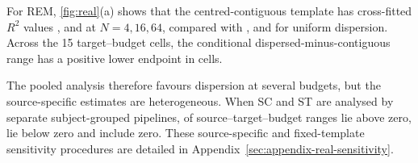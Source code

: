 For REM, \cref{fig:real}(a) shows that the centred-contiguous template has
cross-fitted $R^2$ values \numCfContigFour, \numCfContigSixteen{} and
\numCfContigSixtyFour{} at $N=4,16,64$, compared with
\numCfUniformFour, \numCfUniformSixteen{} and \numCfUniformSixtyFour{} for
uniform dispersion. Across the 15 target--budget cells, the conditional
dispersed-minus-contiguous range has a positive lower endpoint in
\numSleepAdjustedPositiveRanges{} cells.

The pooled analysis therefore favours dispersion at several budgets, but the
source-specific estimates are heterogeneous. When SC and ST are analysed by
separate subject-grouped pipelines, \numSleepCohortPositiveRanges{} of
\numSleepCohortCells{} source--target--budget ranges lie above zero,
\numSleepCohortNegativeRanges{} lie below zero and
\numSleepCohortUnresolvedRanges{} include zero. These source-specific and
fixed-template sensitivity procedures are detailed in
Appendix~\ref{sec:appendix-real-sensitivity}.
